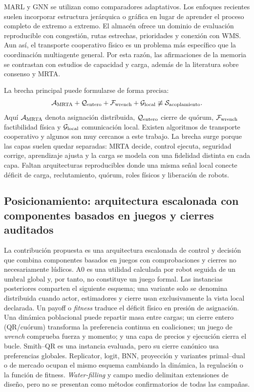 MARL y GNN se utilizan como comparadores adaptativos. Los enfoques recientes suelen
incorporar estructura jerárquica o gráfica en lugar de aprender el proceso completo de
extremo a extremo. El almacén ofrece un dominio de evaluación reproducible con congestión,
rutas estrechas, prioridades y conexión con WMS. Aun así, el transporte cooperativo físico
es un problema más específico que la coordinación multiagente general. Por esta razón, las
afirmaciones de la memoria se contrastan con estudios de capacidad y carga, además de la
literatura sobre consenso y MRTA.

La brecha principal puede formularse de forma precisa:
\[
  \mathcal A_{\rm MRTA}
  + \mathcal Q_{\rm entero}
  + \mathcal F_{\rm wrench}
  + \mathcal G_{\rm local}
  \not\equiv
  \mathcal S_{\rm acoplamiento}.
\]
Aquí $\mathcal A_{\rm MRTA}$ denota asignación distribuida, $\mathcal Q_{\rm entero}$
cierre de quórum, $\mathcal F_{\rm wrench}$ factibilidad física y
$\mathcal G_{\rm local}$ comunicación local. Existen algoritmos de transporte cooperativo
y algunos son muy cercanos a este trabajo. La brecha surge porque las capas suelen quedar
separadas: MRTA decide, control ejecuta, seguridad corrige, aprendizaje
ajusta y la carga se modela con una fidelidad distinta en cada capa. Faltan arquitecturas
reproducibles donde una misma señal local conecte déficit de carga, reclutamiento,
quórum, roles físicos y liberación de robots.



\subsection{Posicionamiento: arquitectura escalonada con componentes basados en juegos y cierres auditados}

La contribuci\'on propuesta es una arquitectura escalonada de control y decisi\'on que combina componentes basados en juegos con comprobaciones y cierres no necesariamente lúdicos. A0 es una utilidad calculada por robot seguida de un umbral global y, por tanto, no constituye un juego formal. Las instancias posteriores comparten el siguiente esquema; una variante solo se denomina distribuida cuando actor, estimadores y cierre usan exclusivamente la vista local declarada. Un payoff o \emph{fitness} traduce el d\'eficit f\'isico en presi\'on de asignaci\'on. Una din\'amica poblacional puede repartir masa entre cargas; un cierre entero (QR/cu\'orum) transforma la preferencia continua en coaliciones; un juego de \emph{wrench} comprueba fuerza y momento; y una capa de precios y ejecuci\'on cierra el bucle. Smith--QR es una instancia evaluada, pero su cierre can\'onico usa preferencias globales. Replicator, logit, BNN, proyecci\'on y variantes primal--dual o de mercado ocupan el mismo esquema cambiando la din\'amica, la regulaci\'on o la funci\'on de fitness. \emph{Water-filling} y campo medio delimitan extensiones de dise\~no, pero no se presentan como m\'etodos confirmatorios de todas las campa\~nas.

